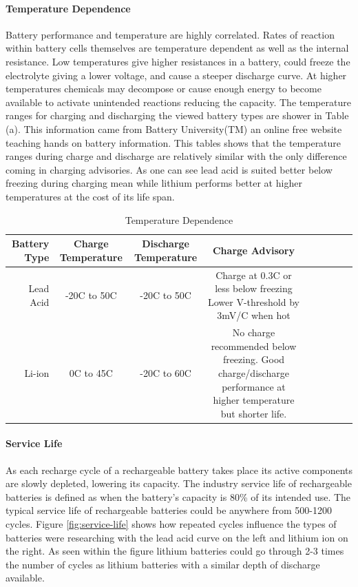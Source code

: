\paragraph{Temperature Dependence}
Battery performance and temperature are highly correlated. Rates of reaction within battery cells themselves are temperature dependent as well as the internal resistance. Low temperatures give higher resistances in a battery, could freeze the electrolyte giving a lower voltage, and cause a steeper discharge curve. At higher temperatures chemicals may decompose or cause enough energy to become available to activate unintended reactions reducing the capacity. The temperature ranges for charging and discharging the viewed battery types are shower in Table (a). This information came from Battery University(TM) an online free website teaching hands on battery information. This tables shows that the temperature ranges during charge and discharge are relatively similar with the only difference coming in charging advisories. As one can see lead acid is suited better below freezing during charging mean while lithium performs better at higher temperatures at the cost of its life span. 
\begin{table}[H]
\centering\scriptsize
\caption{Temperature Dependence}
\begin{tabular}{|r|c|c|c|c|c|c|c|c|}
\hline
Battery Type & Charge Temperature & Discharge Temperature & Charge Advisory \\ 
\hline\hline

Lead Acid     & -20C to 50C   & -20C to 50C & Charge at 0.3C or less below freezing Lower V-threshold by 3mV/C when hot  \\\hline
Li-ion        & 0C to 45C     & -20C to 60C & No charge recommended below freezing. Good charge/discharge performance at higher temperature but shorter life.  \\\hline

\end{tabular}
\end{table}
\paragraph{Service Life}
As each recharge cycle of a rechargeable battery takes place its active components are slowly depleted, lowering its capacity. The industry service life of rechargeable batteries is defined as when the battery's capacity is 80\% of its intended use. The typical service life of rechargeable batteries could be anywhere from 500-1200 cycles. Figure \ref{fig:service-life} shows how repeated cycles influence the types of batteries were researching with the lead acid curve on the left and lithium ion on the right. As seen within the figure lithium batteries could go through 2-3 times the number of cycles as lithium batteries with a similar depth of discharge available.

